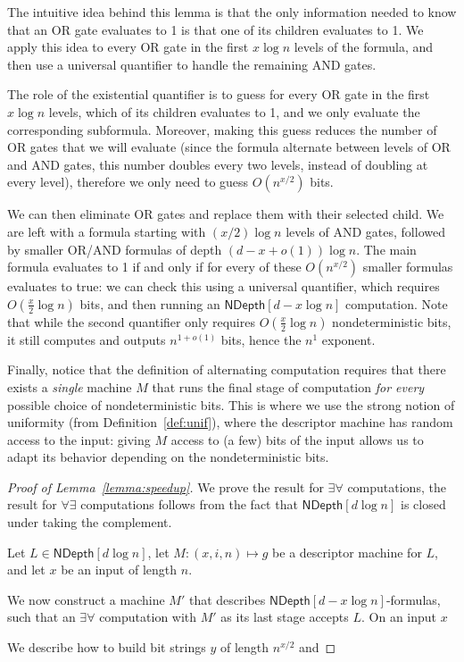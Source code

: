 \documentclass[a4paper, 11pt]{article}
\theoremstyle{plain}
\theoremstyle{definition}
\theoremstyle{remark}
\newcommand{\ND}{\textsf{NDepth}}%
\newcommand{\NDL}[1]{\ND\left[ #1 \log n\right]}%
\newcommand{\todoh}[1]{\todo[inline]{TODO: #1 }}%
\begin{document}
The intuitive idea behind this lemma is that the only
information needed to know that an OR gate evaluates
to 1 is that one of its children evaluates to 1. 
We apply this idea to every OR gate in the first $x \log n$
levels of the formula,
and then use a universal quantifier to handle the remaining AND gates.

The role of the existential quantifier is to guess for every OR gate in the first $x\log n$ levels,
which of its children evaluates to 1, and we only evaluate the corresponding subformula.
Moreover, making this guess reduces the number of OR gates that we will evaluate
(since the formula alternate between levels of OR and AND gates, this number doubles every two levels,
instead of doubling at every level), 
therefore we only need to guess $O(n^{x/2})$ bits. 

We can then eliminate OR gates and replace them with their selected child.
We are left with a formula starting with $(x/2)\log n$ levels of AND gates, 
followed by smaller OR/AND formulas of depth $(d-x + o(1)) \log n$.
The main formula evaluates to 1 if and only if for every of these $O(n^{x/2})$
smaller formulas evaluates to true: 
we can check this using a universal quantifier, 
which requires $O(\frac{x}{2}\log n)$ bits, and then running an $\NDL{d-x}$ computation.
Note that while the second quantifier only requires $O(\frac{x}{2}\log n)$ nondeterministic bits,
it still computes and outputs $n^{1+o(1)}$ bits, hence the $n^1$ exponent. 

Finally, notice that the definition of alternating computation
requires that there exists a \textit{single} machine $M$ that runs the
final stage of computation \textit{for every} possible choice of nondeterministic bits.
This is where we use the strong notion of uniformity (from Definition~\ref{def:unif}), where the descriptor machine
has random access to the input: giving $M$ access to (a few) bits of the input
allows us to adapt its behavior depending on the nondeterministic bits. 

\begin{proof}[Proof of Lemma~\ref{lemma:speedup}]
	We prove the result for $\exists\forall$ computations, 
	the result for $\forall\exists$ computations follows from the fact
	that $\NDL{d}$ is closed under taking the complement.
	
	Let $L\in\NDL{d}$, let $M : (x,i,n) \mapsto g$ be 
	a descriptor machine for $L$, and let $x$ be an input of length $n$.
	
	We now construct a machine $M'$ that describes $\NDL{d-x}$-formulas,
	such that an $\exists\forall$ computation with $M'$ as its last stage accepts $L$.
	On an input $x$

	We describe how to build bit strings $y$ of length $n^{x/2}$ and
	\todoh{finish details of proof}
\end{proof}
\end{document}
